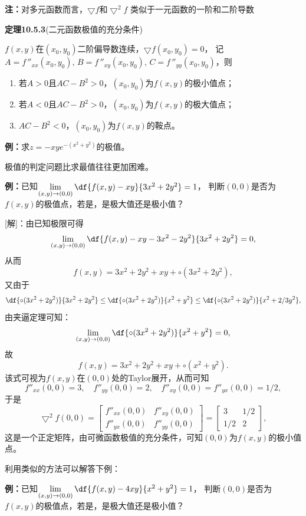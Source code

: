 {\bf 注：}对多元函数而言，$\bigtriangledown f$和$\bigtriangledown^2 f$
类似于一元函数的一阶和二阶导数

{\bf 定理10.5.3}(二元函数极值的充分条件)

$f(x,y)$在$(x_0,y_0)$二阶偏导数连续，$\bigtriangledown f(x_0,y_0)=0$，
记$A=f\,''_{xx}(x_0,y_0),\,B=f\,''_{xy}(x_0,y_0),\,C=f\,''_{yy}(x_0,y_0)$，则
\begin{enumerate}[(1)]
  \setlength{\itemindent}{1cm}
  \item 若$A>0$且$AC-B^2>0$，$(x_0,y_0)$为$f(x,y)$的极小值点；
  \item 若$A<0$且$AC-B^2>0$，$(x_0,y_0)$为$f(x,y)$的极大值点；
  \item $AC-B^2<0$，$(x_0,y_0)$为$f(x,y)$的鞍点。
\end{enumerate}

{\bf 例：}求$z=-xye^{-(x^2+y^2)}$的极值。

极值的判定问题比求最值往往更加困难。

{\bf 例：}已知$\lim\limits_{(x,y)\to(0,0)}\df{f(x,y)-xy}{3x^2+2y^2}=1$，
判断$(0,0)$是否为$f(x,y)$的极值点，若是，是极大值还是极小值？

[解]：由已知极限可得
$$\lim\limits_{(x,y)\to(0,0)}\df{f(x,y)-xy-3x^2-2y^2}{3x^2+2y^2}=0,$$
从而
$$f(x,y)=3x^2+2y^2+xy+\circ(3x^2+2y^2),$$
又由于
$$\df{\circ(3x^2+2y^2)}{3x^2+2y^2}\leq\df{\circ(3x^2+2y^2)}{x^2+y^2}
\leq\df{\circ(3x^2+2y^2)}{x^2+2/3y^2},$$
由夹逼定理可知：
$$\lim\limits_{(x,y)\to(0,0)}\df{\circ(3x^2+2y^2)}{x^2+y^2}=0,$$
故
$$f(x,y)=3x^2+2y^2+xy+\circ(x^2+y^2).$$
该式可视为$f(x,y)$在$(0,0)$处的Taylor展开，从而可知
$$f''_{xx}(0,0)=3,\quad f''_{yy}(0,0)=2,
\quad f''_{xy}(0,0)=f''_{yx}(0,0)=1/2,$$
于是
$$\bigtriangledown^2f(0,0)=\left[\begin{array}{cc}
f''_{xx}(0,0) & f''_{xy}(0,0) \\ f''_{yx}(0,0) & f''_{yy}(0,0)
\end{array}\right]
=\left[\begin{array}{cc}
3 & 1/2 \\ 1/2 &2
\end{array}\right],$$
这是一个正定矩阵，由可微函数极值的充分条件，可知$(0,0)$为$f(x,y)$的极小值点。

利用类似的方法可以解答下例：

{\bf 例：}已知$\lim\limits_{(x,y)\to(0,0)}\df{f(x,y)-4xy}{x^2+y^2}=1$，
判断$(0,0)$是否为$f(x,y)$的极值点，若是，是极大值还是极小值？


